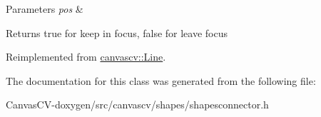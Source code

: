 \begin{DoxyParams}{Parameters}
{\em pos} & \\
\hline
\end{DoxyParams}
\begin{DoxyReturn}{Returns}
true for keep in focus, false for leave focus 
\end{DoxyReturn}


Reimplemented from \hyperlink{classcanvascv_1_1Line_ace7269cabd2acbb2c9da009740f46fa3}{canvascv\+::\+Line}.



The documentation for this class was generated from the following file\+:\begin{DoxyCompactItemize}
\item 
Canvas\+C\+V-\/doxygen/src/canvascv/shapes/shapesconnector.\+h\end{DoxyCompactItemize}
